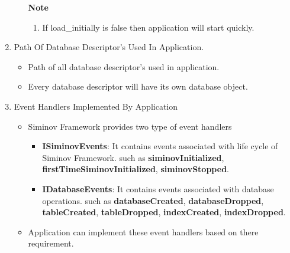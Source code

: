 \begin{enumerate}
\begin{enumerate}
\begin{center}
{{						\hfill \textbf{Note} \\

						\hfill 	
						\begin{enumerate}
			
							\item \small If load\_initially is false then application will start quickly.

						\end{enumerate}

						\vspace*{0.0cm} %
				}
			}

		\end{center}

		
		\end{enumerate}

	\item \small Path Of Database Descriptor's Used In Application.

		\begin{itemize}

			\item \small Path of all database descriptor's used in application.
			\item \small Every database descriptor will have its own database object.
		
		\end{itemize}

	\item \small Event Handlers Implemented By Application 

		\begin{itemize}

			\item \small Siminov Framework provides two type of event handlers
			
				\begin{itemize}
					\item \small \textbf{ISiminovEvents}: It contains events associated with life cycle of Siminov Framework. such as \textbf{siminovInitialized}, \textbf{firstTimeSiminovInitialized}, \textbf{siminovStopped}.
					\item \small \textbf{IDatabaseEvents}: It contains events associated with database operations. such as \textbf{databaseCreated}, \textbf{databaseDropped}, \textbf{tableCreated}, \textbf{tableDropped}, \textbf{indexCreated}, 													\textbf{indexDropped}.
		
				\end{itemize}

			\item \small Application can implement these event handlers based on there requirement.

		\end{itemize}

\end{enumerate}

